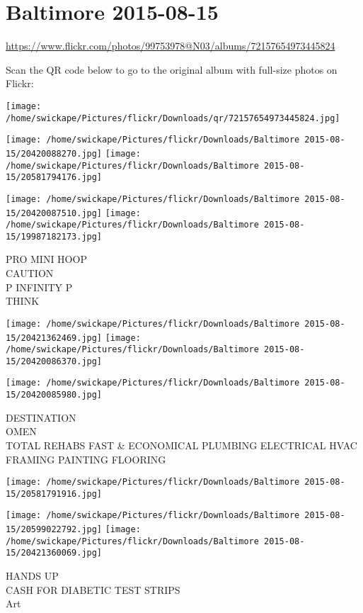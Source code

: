 \documentclass[10pt,letterpaper]{article}
\title{}
\author{}
\date{}
\begin{document}
\section*{Baltimore 2015-08-15}

\url{https://www.flickr.com/photos/99753978@N03/albums/72157654973445824}

Scan the QR code below to go to the original album with full-size photos on Flickr:

\texttt{[image: /home/swickape/Pictures/flickr/Downloads/qr/72157654973445824.jpg]}
\pagebreak

\texttt{[image: /home/swickape/Pictures/flickr/Downloads/Baltimore 2015-08-15/20420088270.jpg]}
\texttt{[image: /home/swickape/Pictures/flickr/Downloads/Baltimore 2015-08-15/20581794176.jpg]}

\texttt{[image: /home/swickape/Pictures/flickr/Downloads/Baltimore 2015-08-15/20420087510.jpg]}
\texttt{[image: /home/swickape/Pictures/flickr/Downloads/Baltimore 2015-08-15/19987182173.jpg]}

PRO MINI HOOP\\
CAUTION\\
P INFINITY P\\
THINK
\pagebreak

\texttt{[image: /home/swickape/Pictures/flickr/Downloads/Baltimore 2015-08-15/20421362469.jpg]}
\texttt{[image: /home/swickape/Pictures/flickr/Downloads/Baltimore 2015-08-15/20420086370.jpg]}

\texttt{[image: /home/swickape/Pictures/flickr/Downloads/Baltimore 2015-08-15/20420085980.jpg]}

DESTINATION\\
OMEN\\
TOTAL REHABS FAST \& ECONOMICAL PLUMBING ELECTRICAL HVAC FRAMING PAINTING FLOORING
\pagebreak

\texttt{[image: /home/swickape/Pictures/flickr/Downloads/Baltimore 2015-08-15/20581791916.jpg]}

\vspace{0.25in}
\texttt{[image: /home/swickape/Pictures/flickr/Downloads/Baltimore 2015-08-15/20599022792.jpg]}
\texttt{[image: /home/swickape/Pictures/flickr/Downloads/Baltimore 2015-08-15/20421360069.jpg]}

HANDS UP\\
CASH FOR DIABETIC TEST STRIPS\\
Art
\pagebreak
\end{document}
